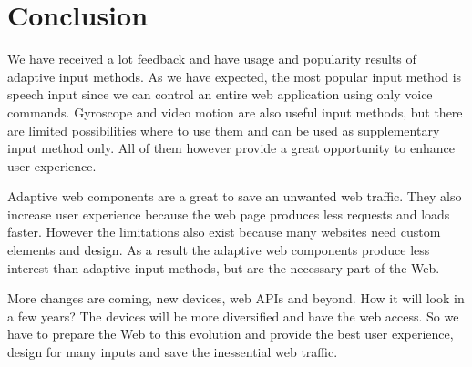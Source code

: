 \documentclass{iitsrc}
\begin{document}



\section{Conclusion} %
\label{sec:conclusion}

We have received a lot feedback and have usage and popularity results of adaptive input methods. As we have expected, the most popular input method is speech input since we can control an entire web application using only voice commands. Gyroscope and video motion are also useful input methods, but there are limited possibilities where to use them and can be used as supplementary input method only. All of them however provide a great opportunity to enhance user experience.

Adaptive web components are a great to save an unwanted web traffic. They also increase user experience because the web page produces less requests and loads faster. However the limitations also exist because many websites need custom elements and design. As a result the adaptive web components produce less interest than adaptive input methods, but are the necessary part of the Web.

More changes are coming, new devices, web APIs and beyond. How it will look in a few years? The devices will be more diversified and have the web access. So we have to prepare the Web to this evolution and provide the best user experience, design for many inputs and save the inessential web traffic.




\end{document}
